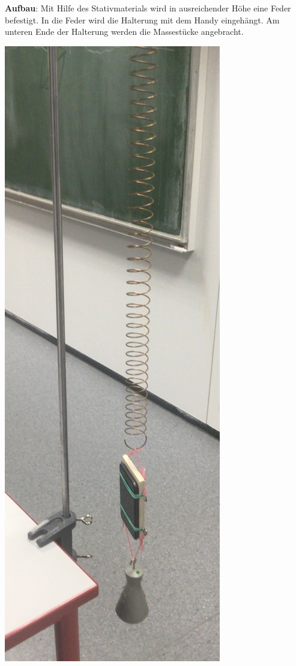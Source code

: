 \documentclass[../main.tex]{subfiles}
\begin{document}
\begin{tcolorbox}
\begin{minipage}[]{0.75\textwidth}
        \vspace{0.5cm}
        \textbf{Aufbau}: Mit Hilfe des Stativmaterials wird in ausreichender Höhe eine Feder befestigt. In die Feder wird die Halterung mit dem Handy eingehängt. Am unteren Ende der Halterung werden die Massestücke angebracht.
    \end{minipage}
    \hspace{0.3cm}
    \begin{minipage}[]{0.2\textwidth}
        \vspace{0.2cm}
        \includegraphics[width=\textwidth]{img/versuchsaufbau}
    \end{minipage}
 

\end{tcolorbox}
\end{document}
